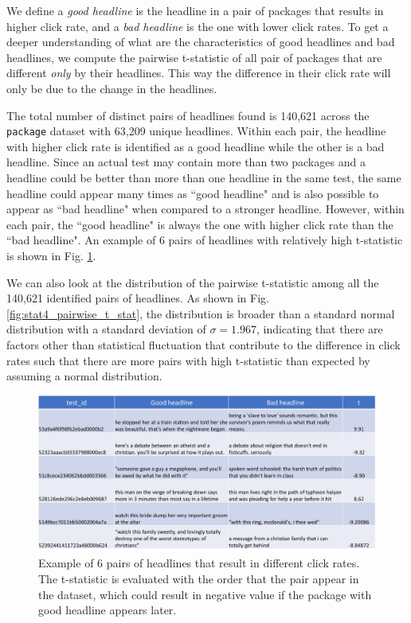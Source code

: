 \documentclass[%
preprint,
 amsmath,amssymb,
 aps,
]{revtex4-2}
\begin{document}
We define a \textit{good headline} is the headline in a pair of packages that results in higher click rate, and a \textit{bad headline} is the one with lower click rates.
To get a deeper understanding of what are the characteristics of good headlines and bad headlines, we compute the pairwise t-statistic of all pair of packages that are different \textit{only} by their headlines.
This way the difference in their click rate will only be due to the change in the headlines.

The total number of distinct pairs of headlines found is 140,621 across the \texttt{package} dataset with 63,209 unique headlines.
Within each pair, the headline with higher click rate is identified as a good headline while the other is a bad headline.
Since an actual test may contain more than two packages and a headline could be better than more than one headline in the same test, the same headline could appear many times as ``good headline" and is also possible to appear as ``bad headline" when compared to a stronger headline.
However, within each pair, the ``good headline" is always the one with higher click rate than the ``bad headline".
An example of 6 pairs of headlines with relatively high t-statistic is shown in Fig. \ref{fig:example_pairs}.

We can also look at the distribution of the pairwise t-statistic among all the 140,621 identified pairs of headlines.
As shown in Fig. \ref{fig:stat4_pairwise_t_stat}, the distribution is broader than a standard normal distribution with a standard deviation of \(\sigma = 1.967\), indicating that there are factors other than statistical fluctuation that contribute to the difference in click rates such that there are more pairs with high t-statistic than expected by assuming a normal distribution.

\begin{figure}
    \centering
    \includegraphics[width=\linewidth]{fig/example_pair_packages_headlines.png}
    \caption{Example of 6 pairs of headlines that result in different click rates. The t-statistic is evaluated with the order that the pair appear in the dataset, which could result in negative value if the package with good headline appears later.}
    \label{fig:example_pairs}
\end{figure}
\end{document}
